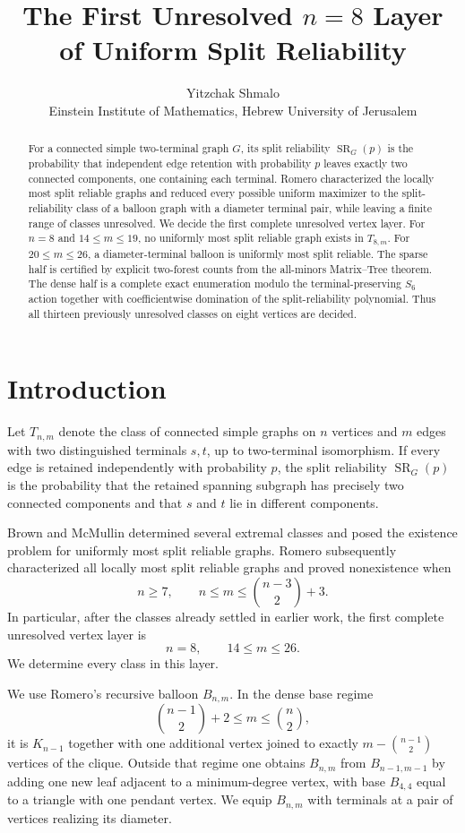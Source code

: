 \documentclass[11pt]{article}
\title{The First Unresolved $n=8$ Layer of Uniform Split Reliability}
\author{Yitzchak Shmalo\\Einstein Institute of Mathematics, Hebrew University of Jerusalem}
\date{}
\newcommand{\SR}{\operatorname{SR}}
\begin{document}
\maketitle

\begin{abstract}
For a connected simple two-terminal graph $G$, its split reliability $\SR_G(p)$ is the probability that independent edge retention with probability $p$ leaves exactly two connected components, one containing each terminal. Romero characterized the locally most split reliable graphs and reduced every possible uniform maximizer to the split-reliability class of a balloon graph with a diameter terminal pair, while leaving a finite range of classes unresolved. We decide the first complete unresolved vertex layer. For $n=8$ and $14\le m\le19$, no uniformly most split reliable graph exists in $T_{8,m}$. For $20\le m\le26$, a diameter-terminal balloon is uniformly most split reliable. The sparse half is certified by explicit two-forest counts from the all-minors Matrix--Tree theorem. The dense half is a complete exact enumeration modulo the terminal-preserving $S_6$ action together with coefficientwise domination of the split-reliability polynomial. Thus all thirteen previously unresolved classes on eight vertices are decided.
\end{abstract}

\section{Introduction}
Let $T_{n,m}$ denote the class of connected simple graphs on $n$ vertices and $m$ edges with two distinguished terminals $s,t$, up to two-terminal isomorphism. If every edge is retained independently with probability $p$, the split reliability $\SR_G(p)$ is the probability that the retained spanning subgraph has precisely two connected components and that $s$ and $t$ lie in different components.

Brown and McMullin determined several extremal classes and posed the existence problem for uniformly most split reliable graphs. Romero subsequently characterized all locally most split reliable graphs and proved nonexistence when
\[
 n\ge7,\qquad n\le m\le \binom{n-3}{2}+3.
\]
In particular, after the classes already settled in earlier work, the first complete unresolved vertex layer is
\[
 n=8,\qquad 14\le m\le26.
\]
We determine every class in this layer.

We use Romero's recursive balloon $B_{n,m}$. In the dense base regime
\[
 \binom{n-1}{2}+2\le m\le \binom n2,
\]
it is $K_{n-1}$ together with one additional vertex joined to exactly
$m-\binom{n-1}{2}$ vertices of the clique. Outside that regime one obtains $B_{n,m}$ from $B_{n-1,m-1}$ by adding one new leaf adjacent to a minimum-degree vertex, with base $B_{4,4}$ equal to a triangle with one pendant vertex. We equip $B_{n,m}$ with terminals at a pair of vertices realizing its diameter.
\end{document}
